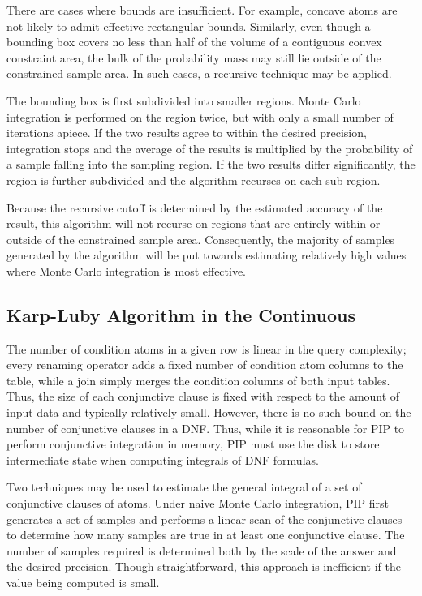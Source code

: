 There are  cases where bounds are insufficient.   For example, concave
atoms  are   not  likely   to  admit  effective   rectangular  bounds.
Similarly, even though a bounding box  covers no less than half of the
volume of a contiguous convex constraint area, the  bulk of the  probability mass may
still lie  outside of the constrained  sample area.  In  such cases, a
recursive technique may be applied.

The  bounding box  is first  subdivided into  smaller  regions.  Monte
Carlo integration  is performed on the  region twice, but  with only a
small number of iterations apiece.  If the two results agree to within
the  desired  precision, integration  stops  and  the  average of  the
results is multiplied by the  probability of a sample falling into the
sampling region.  If the  two results differ significantly, the region
is further subdivided and the algorithm recurses on each sub-region.

Because the  recursive cutoff is determined by  the estimated accuracy
of the  result, this  algorithm will not  recurse on regions  that are
entirely   within  or   outside  of   the  constrained   sample  area.
Consequently, the majority of  samples generated by the algorithm will
be  put towards estimating  relatively high  values where  Monte Carlo
integration is most effective.


\subsection{Karp-Luby Algorithm in the Continuous}


The number  of condition atoms in a  given row  is linear in  the query
complexity;  every renaming operator  adds a  fixed number  of condition
atom  columns to the  table, while  a join  simply merges  the condition
columns  of both  input tables.   Thus, the  size of  each conjunctive
clause is fixed with respect to the amount of input data and typically
relatively small.   However, there is no  such bound on  the number of
conjunctive  clauses  in a DNF.   Thus,  while  it  is
reasonable for  PIP to perform conjunctive integration  in memory, PIP
must use the disk to store intermediate state when computing integrals
of DNF formulas.

Two techniques may  be used to estimate the general  integral of a set
of conjunctive clauses of atoms.  Under naive Monte Carlo integration,
PIP first generates a set of samples and performs a linear scan of the
conjunctive clauses to determine how many samples are true in at least
one conjunctive clause.  The  number of samples required is determined
both by  the scale  of the answer  and the desired  precision.  Though
straightforward,  this  approach is  inefficient  if  the value  being
computed is small.

